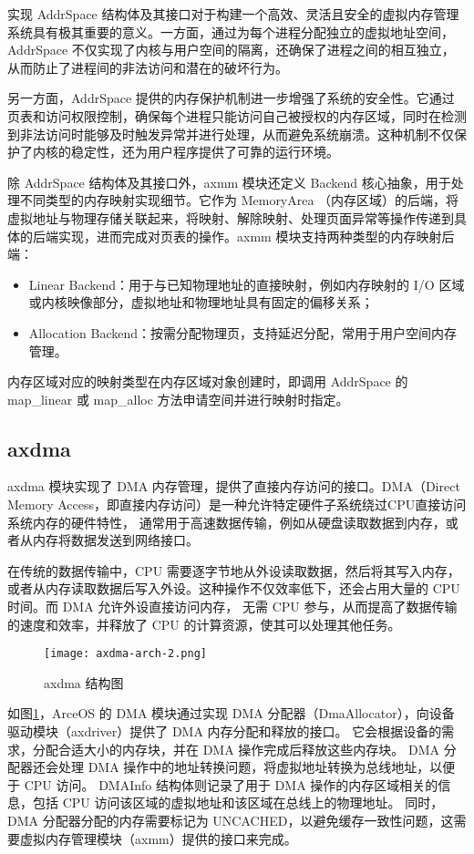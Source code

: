 实现 AddrSpace 结构体及其接口对于构建一个高效、灵活且安全的虚拟内存管理系统具有极其重要的意义。一方面，通过为每个进程分配独立的虚拟地址空间，AddrSpace 不仅实现了内核与用户空间的隔离，还确保了进程之间的相互独立，从而防止了进程间的非法访问和潜在的破坏行为。

另一方面，AddrSpace 提供的内存保护机制进一步增强了系统的安全性。它通过页表和访问权限控制，确保每个进程只能访问自己被授权的内存区域，同时在检测到非法访问时能够及时触发异常并进行处理，从而避免系统崩溃。这种机制不仅保护了内核的稳定性，还为用户程序提供了可靠的运行环境。

除 AddrSpace 结构体及其接口外，axmm 模块还定义 Backend 核心抽象，用于处理不同类型的内存映射实现细节。它作为 MemoryArea （内存区域）的后端，将虚拟地址与物理存储关联起来，将映射、解除映射、处理页面异常等操作传递到具体的后端实现，进而完成对页表的操作。axmm 模块支持两种类型的内存映射后端：
\begin{itemize}
\item Linear Backend：用于与已知物理地址的直接映射，例如内存映射的 I/O 区域或内核映像部分，虚拟地址和物理地址具有固定的偏移关系；
\item Allocation Backend：按需分配物理页，支持延迟分配，常用于用户空间内存管理。
\end{itemize}

内存区域对应的映射类型在内存区域对象创建时，即调用 AddrSpace 的 map\_linear 或 map\_alloc 方法申请空间并进行映射时指定。

\subsection{axdma}
axdma 模块实现了 DMA 内存管理，提供了直接内存访问的接口。DMA（Direct Memory Access，即直接内存访问）是一种允许特定硬件子系统绕过CPU直接访问系统内存的硬件特性，
通常用于高速数据传输，例如从硬盘读取数据到内存，或者从内存将数据发送到网络接口。

在传统的数据传输中，CPU 需要逐字节地从外设读取数据，然后将其写入内存，或者从内存读取数据后写入外设。这种操作不仅效率低下，还会占用大量的 CPU 时间。而 DMA 允许外设直接访问内存，
无需 CPU 参与，从而提高了数据传输的速度和效率，并释放了 CPU 的计算资源，使其可以处理其他任务。

\begin{figure}[H]
    \centering
    \texttt{[image: axdma-arch-2.png]}
    \caption{axdma 结构图}
    \label{fig:axdma-arch}
\end{figure}

如图\ref{fig:axdma-arch}，ArceOS 的 DMA 模块通过实现 DMA 分配器（DmaAllocator），向设备驱动模块（axdriver）提供了 DMA 内存分配和释放的接口。
它会根据设备的需求，分配合适大小的内存块，并在 DMA 操作完成后释放这些内存块。
DMA 分配器还会处理 DMA 操作中的地址转换问题，将虚拟地址转换为总线地址，以便于 CPU 访问。
DMAInfo 结构体则记录了用于 DMA 操作的内存区域相关的信息，包括 CPU 访问该区域的虚拟地址和该区域在总线上的物理地址。
同时，DMA 分配器分配的内存需要标记为 UNCACHED，以避免缓存一致性问题，这需要虚拟内存管理模块（axmm）提供的接口来完成。

